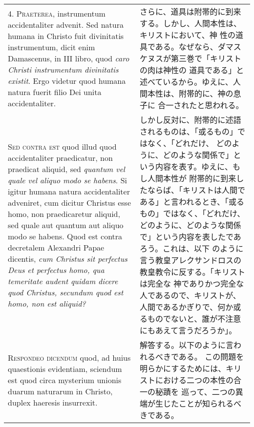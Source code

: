 \documentclass[10pt]{jsarticle} %
\begin{document}
\begin{longtable}{p{21em}p{21em}}
\\



4. {\scshape Praeterea}, instrumentum accidentaliter advenit. Sed natura humana in
Christo fuit divinitatis instrumentum, dicit enim Damascenus, in III
libro, quod {\itshape caro Christi instrumentum divinitatis existit}. Ergo videtur
quod humana natura fuerit filio Dei unita accidentaliter.

&

さらに、道具は附帯的に到来する。しかし、人間本性は、キリストにおいて、神
 性の道具である。なぜなら、ダマスケヌスが第三巻で「キリストの肉は神性の
 道具である」と述べているから。ゆえに、人間本性は、附帯的に、神の息子に
 合一されたと思われる。


\\



{\scshape Sed contra est} quod illud quod accidentaliter praedicatur, non praedicat
aliquid, sed {\itshape quantum vel quale vel aliquo modo se habens}. Si igitur
humana natura accidentaliter adveniret, cum dicitur Christus esse homo,
non praedicaretur aliquid, sed quale aut quantum aut aliquo modo se
habens. Quod est contra decretalem Alexandri Papae dicentis, {\itshape cum
Christus sit perfectus Deus et perfectus homo, qua temeritate audent
quidam dicere quod Christus, secundum quod est homo, non est aliquid?}

&


しかし反対に、附帯的に述語されるものは、「或るもの」ではなく、「どれだけ、
 どのように、どのような関係で」という内容を表す。ゆえに、もし人間本性が
 附帯的に到来したならば、「キリストは人間である」と言われるとき、「或るもの」ではなく、「どれだけ、
 どのように、どのような関係で」という内容を表したであろう。これは、以下
 のように言う教皇アレクサンドロスの教皇教令に反する。「キリストは完全な
 神でありかつ完全な人であるので、キリストが、人間であるかぎりで、何か或
 るものでないと、誰が不注意にもあえて言うだろうか」。

\\



{\scshape Respondeo dicendum} quod, ad huius quaestionis evidentiam, sciendum est
quod circa mysterium unionis duarum naturarum in Christo, duplex
haeresis insurrexit. 

&

解答する。以下のように言われるべきである。
この問題を明らかにするためには、キリストにおける二つの本性の合一の秘蹟を
 巡って、二つの異端が生じたことが知られるべきである。


\end{longtable}
\end{document}
